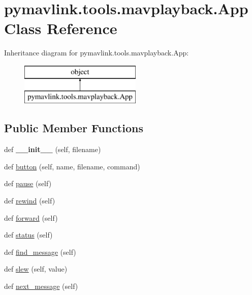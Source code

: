\hypertarget{classpymavlink_1_1tools_1_1mavplayback_1_1App}{}\section{pymavlink.\+tools.\+mavplayback.\+App Class Reference}
\label{classpymavlink_1_1tools_1_1mavplayback_1_1App}
Inheritance diagram for pymavlink.\+tools.\+mavplayback.\+App\+:\begin{figure}[H]
\begin{center}
\leavevmode
\includegraphics[height=2.000000cm]{classpymavlink_1_1tools_1_1mavplayback_1_1App}
\end{center}
\end{figure}
\subsection*{Public Member Functions}
\begin{DoxyCompactItemize}
\item 
\mbox{\label{classpymavlink_1_1tools_1_1mavplayback_1_1App_a5ee472eff5d8d9bb42bd20337e7a0d18}} 
def {\bfseries \+\_\+\+\_\+init\+\_\+\+\_\+} (self, filename)
\item 
def \hyperlink{classpymavlink_1_1tools_1_1mavplayback_1_1App_aada9c02d6fe0a6cf30eca06a9cc4b01b}{button} (self, name, filename, command)
\item 
def \hyperlink{classpymavlink_1_1tools_1_1mavplayback_1_1App_a069dac2f5a8086736d8691779b409cda}{pause} (self)
\item 
def \hyperlink{classpymavlink_1_1tools_1_1mavplayback_1_1App_a414c5e703f584943391a3f0dedc1401b}{rewind} (self)
\item 
def \hyperlink{classpymavlink_1_1tools_1_1mavplayback_1_1App_a09ac8360859a9b2e685612b6504fb951}{forward} (self)
\item 
def \hyperlink{classpymavlink_1_1tools_1_1mavplayback_1_1App_ab09676f5e32cc2023ce9bf476418ee21}{status} (self)
\item 
def \hyperlink{classpymavlink_1_1tools_1_1mavplayback_1_1App_a51fb5db450ed3c0988122799a5cf2727}{find\+\_\+message} (self)
\item 
def \hyperlink{classpymavlink_1_1tools_1_1mavplayback_1_1App_a146a9c59d441295f276aa2bab3b8aa63}{slew} (self, value)
\item 
def \hyperlink{classpymavlink_1_1tools_1_1mavplayback_1_1App_a62a2ef2e9a935c44fcb7348ad4e32e77}{next\+\_\+message} (self)
\end{DoxyCompactItemize}
